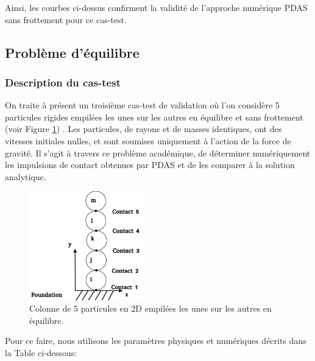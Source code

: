 Ainsi, les courbes ci-dessus confirment la validité de l'approche numérique PDAS sans frottement pour ce cas-test.

\subsection{Problème d'équilibre}

\subsubsection{Description du cas-test}

On traite à présent un troisième cas-test de validation où l'on considère 5 particules rigides empilées les unes sur les autres en équilibre et sans frottement (voir Figure \ref{fig311}) . Les particules, de rayons et de masses identiques, ont des vitesses initiales nulles, et sont soumises uniquement à l'action de la force de gravité. Il s'agit à travers ce problème académique, de déterminer numériquement les impulsions de contact obtenues par PDAS et de les comparer à la solution analytique. 

\begin{figure}[!h]
  \centering
    \includegraphics[width=0.45\textwidth]{chapitres/chapitre_3/figures/5_stacked_particles.png}
    \caption{Colonne de 5 particules en 2D empilées les unes sur les autres en équilibre.}\label{fig311}
\end{figure}

Pour ce faire, nous utilisons les paramètres physiques et numériques décrits dans la Table ci-dessous:

